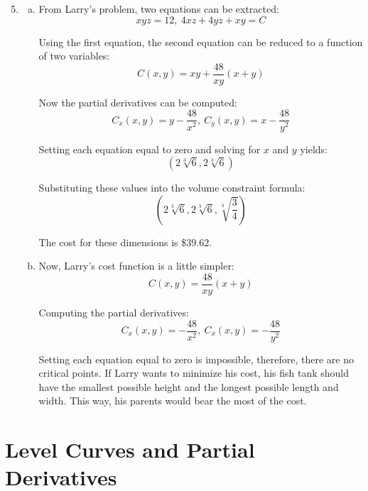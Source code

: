 \documentclass{article}
\begin{document}
\begin{enumerate}[1.]
  \setcounter{enumi}{4}
  \item \begin{enumerate}[a.]
      \item From Larry's problem, two equations can be extracted:
        $$ x y z = 12,\ 4 xz + 4 yz + xy = C $$

        Using the first equation, the second equation can be reduced to a
        function of two variables:
        $$ C(x, y) = xy + \frac{ 48 }{ xy }(x + y) $$

        Now the partial derivatives can be computed:
        $$ C_{x}(x, y) = y - \frac{ 48 }{ x^{2} },\ C_{y}(x, y) = x - \frac{ 48
        }{ y^{2} } $$

        Setting each equation equal to zero and solving for $x$ and $y$ yields:
        $$ \left(2 \sqrt[3]{6}, 2 \sqrt[3]{6}\right) $$

        Substituting these values into the volume constraint formula:
        $$ \left(2 \sqrt[3]{6}, 2 \sqrt[3]{6}, \sqrt[3]{\frac{ 3 }{ 4 }}\right) $$

        The cost for these dimensions is \$39.62.

      \item Now, Larry's cost function is a little simpler:
        $$ C(x, y) = \frac{ 48 }{ xy }(x + y) $$

        Computing the partial derivatives:
        $$ C_{x}(x, y) = -\frac{ 48 }{ x^{2} },\ C_{x}(x, y) = -\frac{ 48 }{
        y^{2} } $$

        Setting each equation equal to zero is impossible, therefore, there are
        no critical points. If Larry wants to minimize his cost, his fish tank
        should have the smallest possible height and the longest possible length
        and width. This way, his parents would bear the most of the cost.

    \end{enumerate}
\end{enumerate}

\section{Level Curves and Partial Derivatives}
\end{document}
